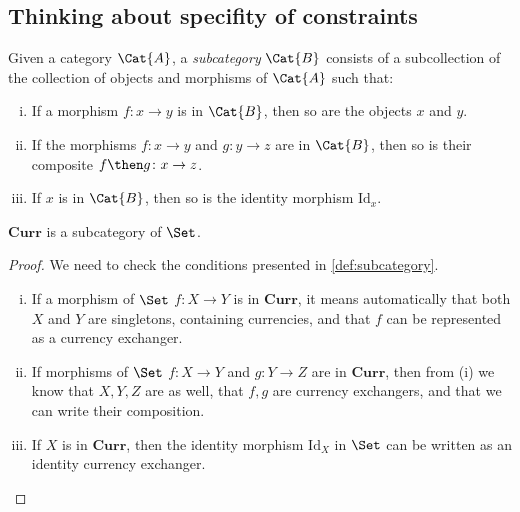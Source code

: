 \subsection{Thinking about specifity of constraints}
\begin{shaded}
\begin{definition}[Subcategory]
\label{def:subcategory}
	Given a category $\Cat{A}$, a \emph{subcategory} $\Cat{B}$ consists of a subcollection of the collection of objects and morphisms of $\Cat{A}$ such that:
	\begin{enumerate}[(i)]
	\item If a morphism $f \colon x\to y$ is in $\Cat{B}$, then so are the objects $x$ and $y$.
	\item If the morphisms $f\colon x\to y$ and $g\colon y\to z$ are in $\Cat{B}$, then so is their composite $f\then g\colon x\to z$.
	\item If $x$ is in $\Cat{B}$, then so is the identity morphism $\text{Id}_x$.
	\end{enumerate}
\end{definition}
\end{shaded}

\begin{lemma}
    $\mathbf{Curr}$ is a subcategory of $\Set$.
\end{lemma}

\begin{proof}
    We need to check the conditions presented in \cref{def:subcategory}.
    \begin{enumerate}[(i)]
        \item If a morphism of $\Set$ $f\colon X\to Y$ is in $\mathbf{Curr}$, it means automatically that both $X$ and $Y$ are singletons, containing currencies, and that $f$ can be represented as a currency exchanger.
        \item If morphisms of $\Set$ $f\colon X\to Y$ and $g\colon Y \to Z$ are in $\mathbf{Curr}$, then from (i) we know that $X,Y,Z$ are as well, that $f,g$ are currency exchangers, and that we can write their composition.
        \item If $X$ is in $\mathbf{Curr}$, then the identity morphism $\text{Id}_X$ in $\Set$ can be written as an identity currency exchanger.
    \end{enumerate}
\end{proof}